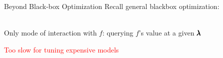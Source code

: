 
\begin{frame}{Beyond Black-box Optimization}
\medskip
Recall general blackbox optimization:\\
        \bigskip
        \begin{center}
        \scalebox{0.7}{\hspace*{1.0cm}
        }\\
        \bigskip
         Only mode of interaction with $f$: querying $f$'s value at a given $\pmb{\lambda}$
        
\pause
        \bigskip
        \bigskip
        \huge{\textcolor{red}{Too slow for tuning expensive models}}
        
        \end{center}
\vspace*{-6cm}
\begin{center}
\scalebox{15}{\color{Red}{$\bm{\times}$}}
\end{center}    
    
\end{frame}



